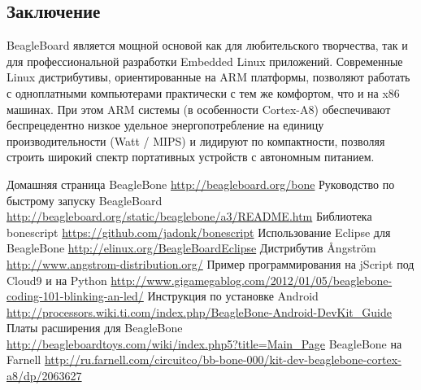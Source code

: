 \documentclass[10pt, a5paper]{article}
\begin{document}
\subsection*{Заключение}

BeagleBoard является мощной основой как для любительского творчества, так и для профессиональной разработки Embedded Linux приложений. Современные Linux дистрибутивы, ориентированные на ARM платформы, позволяют работать с одноплатными компьютерами практически с тем же комфортом, что и на x86 машинах. При этом ARM системы (в особенности Cortex-A8) обеспечивают беспрецедентно низкое удельное энергопотребление на единицу производительности (Watt / MIPS) и лидируют по компактности, позволяя строить широкий спектр портативных устройств с автономным питанием.

\begin{thebibliography}{9}
   Домашняя страница BeagleBone \url{http://beagleboard.org/bone}
   Руководство по быстрому запуску BeagleBoard \url{http://beagleboard.org/static/beaglebone/a3/README.htm}
   Библиотека bonescript \url{https://github.com/jadonk/bonescript}
   Использование Eclipse для BeagleBone \url{http://elinux.org/BeagleBoardEclipse}
   Дистрибутив \AA{}ngstr\"{o}m \url{http://www.angstrom-distribution.org/}
   Пример программирования на jScript под Cloud9 и на Python \url{http://www.gigamegablog.com/2012/01/05/beaglebone-coding-101-blinking-an-led/}
   Инструкция по установке Android \url{http://processors.wiki.ti.com/index.php/BeagleBone-Android-DevKit_Guide}
   Платы расширения для BeagleBone \url{http://beagleboardtoys.com/wiki/index.php5?title=Main_Page}
   BeagleBone на Farnell \url{http://ru.farnell.com/circuitco/bb-bone-000/kit-dev-beaglebone-cortex-a8/dp/2063627}
\end{thebibliography}
\end{document}
